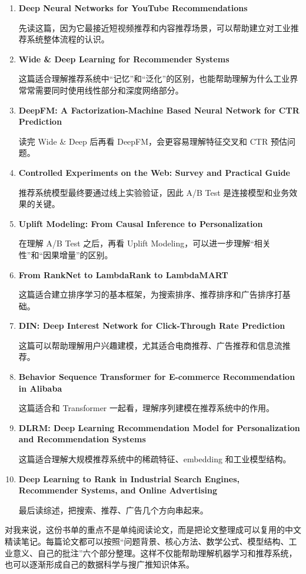\begin{enumerate}
    \item \textbf{Deep Neural Networks for YouTube Recommendations}

    先读这篇，因为它最接近短视频推荐和内容推荐场景，可以帮助建立对工业推荐系统整体流程的认识。

    \item \textbf{Wide \& Deep Learning for Recommender Systems}

    这篇适合理解推荐系统中“记忆”和“泛化”的区别，也能帮助理解为什么工业界常常需要同时使用线性部分和深度网络部分。

    \item \textbf{DeepFM: A Factorization-Machine Based Neural Network for CTR Prediction}

    读完 Wide \& Deep 后再看 DeepFM，会更容易理解特征交叉和 CTR 预估问题。

    \item \textbf{Controlled Experiments on the Web: Survey and Practical Guide}

    推荐系统模型最终要通过线上实验验证，因此 A/B Test 是连接模型和业务效果的关键。

    \item \textbf{Uplift Modeling: From Causal Inference to Personalization}

    在理解 A/B Test 之后，再看 Uplift Modeling，可以进一步理解“相关性”和“因果增量”的区别。

    \item \textbf{From RankNet to LambdaRank to LambdaMART}

    这篇适合建立排序学习的基本框架，为搜索排序、推荐排序和广告排序打基础。

    \item \textbf{DIN: Deep Interest Network for Click-Through Rate Prediction}

    这篇可以帮助理解用户兴趣建模，尤其适合电商推荐、广告推荐和信息流推荐。

    \item \textbf{Behavior Sequence Transformer for E-commerce Recommendation in Alibaba}

    这篇适合和 Transformer 一起看，理解序列建模在推荐系统中的作用。

    \item \textbf{DLRM: Deep Learning Recommendation Model for Personalization and Recommendation Systems}

    这篇适合理解大规模推荐系统中的稀疏特征、embedding 和工业模型结构。

    \item \textbf{Deep Learning to Rank in Industrial Search Engines, Recommender Systems, and Online Advertising}

    最后读综述，把搜索、推荐、广告几个方向串起来。
\end{enumerate}

\begin{note}
对我来说，这份书单的重点不是单纯阅读论文，而是把论文整理成可以复用的中文精读笔记。每篇论文都可以按照“问题背景、核心方法、数学公式、模型结构、工业意义、自己的批注”六个部分整理。这样不仅能帮助理解机器学习和推荐系统，也可以逐渐形成自己的数据科学与搜广推知识体系。
\end{note}
